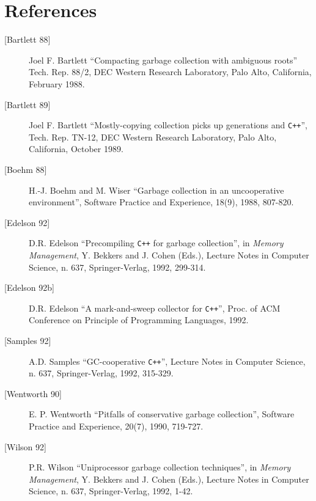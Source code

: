 \section{References}
\begin{description}
\item [{[Bartlett 88]}]	Joel F. Bartlett  ``Compacting garbage collection with
ambiguous roots''  Tech. Rep.  88/2, DEC Western Research Laboratory,
Palo Alto, California, February 1988.
\item [{[Bartlett 89]}]	Joel F. Bartlett  ``Mostly-copying collection picks up generations and {\tt C++}'', 
Tech.  Rep.  TN-12, DEC Western Research Laboratory, Palo Alto,
California, October 1989.
\item [{[Boehm 88]}]	H.-J. Boehm and M. Wiser  ``Garbage collection in an uncooperative
environment'',  Software Practice and Experience, 18(9), 1988, 807-820.
\item [{[Edelson 92]}]	D.R. Edelson  ``Precompiling {\tt C++} for garbage collection'', in {\em Memory Management}, Y. Bekkers and J. Cohen (Eds.), Lecture Notes in Computer
Science, n. 637, Springer-Verlag, 1992, 299-314.
\item [{[Edelson 92b]}]	D.R. Edelson  ``A mark-and-sweep collector for {\tt C++}'',  Proc. of ACM
Conference on Principle of Programming Languages, 1992.
\item [{[Samples 92]}]	A.D. Samples  ``GC-cooperative {\tt C++}'',  Lecture Notes in Computer
Science, n. 637, Springer-Verlag, 1992, 315-329.
\item [{[Wentworth 90]}]	E. P. Wentworth  ``Pitfalls of conservative garbage collection'',  Software
Practice and Experience, 20(7), 1990, 719-727.
\item [{[Wilson 92]}]	P.R. Wilson  ``Uniprocessor garbage collection techniques'', in {\em Memory
Management}, Y. Bekkers and J. Cohen (Eds.), Lecture Notes in Computer
Science, n.  637, Springer-Verlag, 1992, 1-42.
\end{description}


